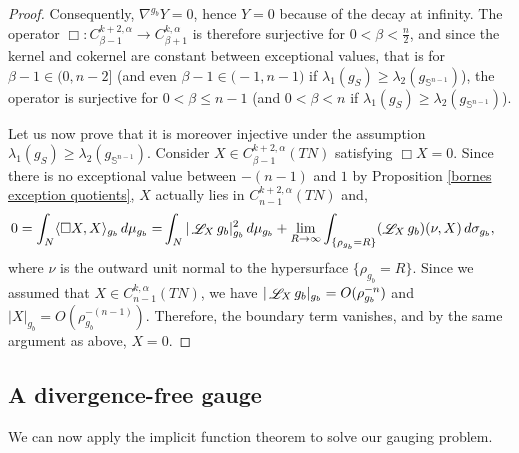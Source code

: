 \documentclass[a4paper,11pt,reqno]{amsart}
\def\Li{\mathop{\rm \mathscr{L}}\nolimits}
\def\Li{\mathop{\rm \mathscr{L}}\nolimits}
\numberwithin{equation}{section}
\begin{document}
\begin{proof}
		Consequently, $\nabla^{g_b} Y = 0$, hence $Y = 0$ because of the decay at infinity. The operator $\Box : C^{k+2,\alpha}_{\beta-1}\to C^{k,\alpha}_{\beta+1}$ is therefore surjective for $0<\beta<\frac{n}{2}$, and since the kernel and cokernel are constant between exceptional values, that is for $\beta-1\in \big(0,n-2\big]$ (and even $\beta-1\in \big(-1,n-1\big)$ if $\lambda_1(g_S)\geq \lambda_2(g_{\mathbb{S}^{n-1}})$), the operator is surjective for $0<\beta\leq n-1$ (and $0<\beta<n$ if $\lambda_1(g_S)\geq \lambda_2(g_{\mathbb{S}^{n-1}})$).
		
		Let us now prove that it is moreover injective under the assumption $\lambda_1(g_S)\geq \lambda_2(g_{\mathbb{S}^{n-1}})$. Consider $X\in C^{k+2,\alpha}_{\beta-1}(TN)$ satisfying $ \Box X=0$. Since there is no exceptional value between $-(n-1)$ and $1$ by Proposition \ref{bornes exception quotients}, $X$ actually lies in $C^{k+2,\alpha}_{n-1}(TN)$ and,
		\begin{align*}
		0= \int_N \langle\Box X,X\rangle_{g_b}\,d\mu_{g_b} =& \int_N |\Li_Xg_b|_{g_b}^2\,d\mu_{g_b} + \lim_{R\to \infty} \int_{\{\rho_{g_b}= R\}} (\Li_Xg_b)(\nu,X)\,d\sigma_{g_b},
		\end{align*}
		where $\nu$ is the outward unit normal to the hypersurface $\{\rho_{g_b}= R\}$. Since we assumed that $X\in C^{k,\alpha}_{n-1}(TN)$, we have $|\Li_Xg_b|_{g_b} = O(\rho_{g_b}^{-n})$ and $|X|_{g_b} =  O(\rho_{g_b}^{-(n-1)})$. Therefore, the boundary term vanishes, and by the same argument as above, $X= 0$.
	\end{proof}
	
	\subsection{A divergence-free gauge}
	
	We can now apply the implicit function theorem to solve our gauging problem.
	
\end{document}
